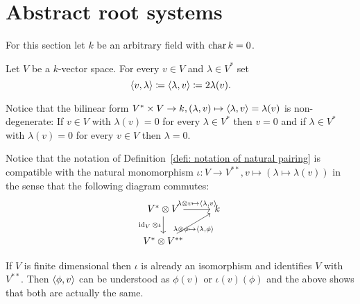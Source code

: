 \section{Abstract root systems}
For this section let $k$ be an arbitrary field with $\operatorname{char} k = 0$.


\begin{definition}\label{defi: notation of natural pairing}
 Let $V$ be a $k$-vector space. For every $v \in V$ and $\lambda \in V^*$ set
 \[
  \langle v, \lambda\rangle \coloneqq \langle\lambda, v\rangle \coloneqq2 \lambda(v).
 \]
\end{definition}


\begin{remark}\label{rem: natural pairing is nondegenerate}
 Notice that the bilinear form $V^* \times V \to k, (\lambda,  v) \mapsto \langle\lambda, v\rangle = \lambda(v)$ is non-degenerate: If $v \in V$ with $\lambda(v) = 0$ for every $\lambda \in V^*$ then $v = 0$ and if $\lambda \in V^*$ with $\lambda(v) = 0$ for every $v \in V$ then $\lambda = 0$.
\end{remark}


\begin{remark}
 Notice that the notation of Definition~\ref{defi: notation of natural pairing} is compatible with the natural monomorphism $\iota \colon V \to V^{**}, v \mapsto (\lambda \mapsto \lambda(v))$ in the sense that the following diagram commutes:
 \[
   \begin{tikzcd}
     V^* \otimes V
     \arrow{r}[above]{\lambda \otimes v \mapsto \pair{\lambda, v}}
     \arrow{d}[left]{\id_V \otimes \iota}
     &
     k
     \\
     V^* \otimes V^{**}
     \arrow{ur}[below]{\lambda \otimes \phi \mapsto \pair{\lambda, \phi}}
     &
     {}
   \end{tikzcd}
 \]
 
 If $V$ is finite dimensional then $\iota$ is already an isomorphism and identifies $V$ with $V^{**}$. Then $\langle\phi, v\rangle$ can be understood as $\phi(v)$ or $\iota(v)(\phi)$ and the above shows that both are actually the same.
\end{remark}



